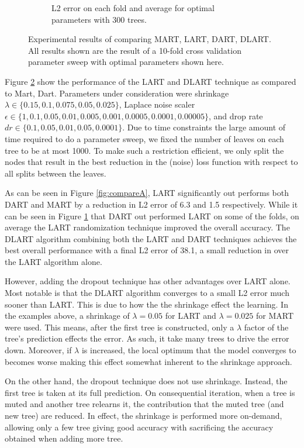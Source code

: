 \documentclass{article} %
\begin{document}
\begin{figure}
\begin{subfigure}{.49\textwidth}
\caption{L2 error on each fold and average for optimal parameters with 300 trees.\label{fig:compareB}}
\end{subfigure}
\caption{Experimental results of comparing MART, LART, DART, DLART. All results shown are the result of a 10-fold cross validation parameter sweep with optimal parameters shown here.  \label{fig:compare}}
\end{figure}

Figure \ref{fig:compare} show the performance of the LART and DLART technique as compared to Mart, Dart. Parameters under consideration were shrinkage $\lambda\in\{0.15, 0.1,0.075, 0.05, 0.025 \}$, Laplace noise scaler $\epsilon\in \{ 1, 0.1,0.05, 0.01, 0.005, 0.001 ,0.0005,0.0001, 0.00005\}$, and drop rate  $dr\in \{0.1, 0.05, 0.01, 0.05, 0.0001\}$. Due to time constraints the large amount of time required to do a parameter sweep, we fixed the number of leaves on each tree to be at most 1000. To make such a restriction efficient, we only split the nodes that result in the best reduction in the (noise) loss function with respect to all splits between the leaves.

As can be seen in Figure \ref{fig:compareA}, LART significantly out performs both DART and MART by a reduction in L2 error of  6.3 and 1.5 respectively. While it can be seen in Figure \ref{fig:compareB} that DART out performed LART on some of the folds, on average the LART randomization technique improved the overall accuracy. The DLART algorithm  combining both the LART and DART techniques achieves the best overall performance with a final L2 error of 38.1, a small reduction in over the LART algorithm alone. 

However, adding the dropout technique has other advantages over LART alone. Most notable is that the DLART algorithm converges to a small L2 error much sooner than LART. This is due to how the the shrinkage effect the learning. In the examples above, a shrinkage of $\lambda=0.05$ for LART and $\lambda=0.025$ for MART were used. This means, after the first tree is constructed, only a $\lambda$ factor of the tree's prediction effects the error. As such, it take many trees to drive the error down. Moreover, if $\lambda$ is increased, the local optimum that the model converges to becomes worse making this effect somewhat inherent to the shrinkage approach. 

On the other hand, the dropout technique does not use shrinkage. Instead, the first tree is taken at its full prediction. On consequential iteration, when a tree is muted and another tree relearns it, the contribution that the muted tree (and new tree) are reduced. In effect, the shrinkage is performed more on-demand, allowing only a few tree giving good accuracy with sacrificing the accuracy obtained when adding more tree. 
\end{document}
